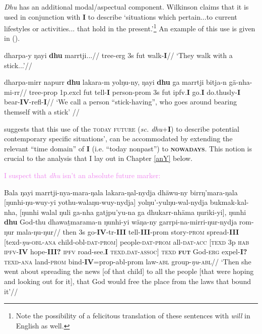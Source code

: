 \textit{Dhu} has an additional modal/aspectual component. Wilkinson claims that it is used in conjunction with \textbf{I} to describe `situations which pertain...to current lifestyles or activities... that hold in the present.'\footnote{Note the possibility of a felicitous translation of these sentences with \textit{will} in English as well.} An example of this use is given in (\nextx).

\pex\a\begingl\gla dharpa-y ŋayi \textbf{dhu} marrtji...//
\glb tree-\gls{erg} 3s \gls{fut} walk-\textbf{I}//
\glft`They walk with a stick...'//\endgl%

\a\begingl\gla dharpa-mirr napurr \textbf{dhu} lakara-m yolŋu-ny, ŋayi \textbf{dhu} ga marrtji bitja-n gä-nha-mi-rr//
\glb tree-\gls{prop} 1p.\gls{excl} \gls{fut} tell-\textbf{I} person-\gls{prom} 3s \gls{fut} \gls{ipfv}.\textbf{I} go.\textbf{I} do.thusly-\textbf{I} bear-\textbf{IV}-\gls{refl}-\textbf{I}//
\glft`We call a person ``stick-having'', who goes around bearing themself with a stick' //\endgl\xe

\citet[346]{Wilkinson1991} suggests that this use of the \textsc{today future} (\textit{sc. dhu}+\textbf{I}) to describe potential contemporary specific situations', can be accommodated by extending the relevant ``time domain'' of \textbf{I} (i.e. ``today nonpast'') to \textbf{\textsc{nowadays}}. This notion is crucial to the analysis that I lay out in Chapter \ref{anY} below.




\textcolor{violet}{I suspect that \textit{dhu} isn't an absolute future marker:}

\pex \begingl \gla Bala ŋayi marrtji-nya-mara-ŋala lakara-ŋal-nydja dhäwu-ny birrŋ'mara-ŋala [ŋunhi-ŋu-wuy-yi yothu-walaŋu-wuy-nydja] yolŋu'-yulŋu-wal-nydja bukmak-kal-nha, [ŋunhi walal ŋuli ga-nha gatjpu'yu-na ga dhukarr-nhäma ŋuriki-yi], ŋunhi \textbf{dhu} God-thu dhawaṯmarama-n ŋunhi-yi wäŋa-ny garrpi-na-mirri-ŋur-nydja rom-ŋur mala-ŋu-ŋur//
\glb then 3s go-\textbf{IV}-\gls{tr}-\textbf{III} tell-\textbf{III}-\gls{prom} story-\textsc{prom} spread-\textbf{III} [\gls{texd}-\textit{ŋu}-\textsc{obl}-\textsc{ana} child-\gls{obl}-\textsc{dat}-\textsc{prom}] people-\textsc{dat-prom} all-\textsc{dat-acc} [\textsc{texd} 3p \textsc{hab} \textsc{ipfv}-\textbf{IV} hope-\textbf{III?} \textsc{ipfv} road-see.\textbf{I} \textsc{texd.dat-assoc}] \textsc{texd} \textsc{\textbf{fut}} God-\textsc{erg} expel-\textbf{I?} \textsc{texd-ana} land-\textsc{prom} bind-\textbf{IV}=\gls{prop}-\gls{abl}-\gls{prom} law-\textsc{abl} group-\textit{ŋu}-\textsc{abl}//
\glft`Then she went about spreading the news [of that child] to all the people [that were hoping and looking out for it], that God would free the place from the laws that bound it'//\endgl\xe

